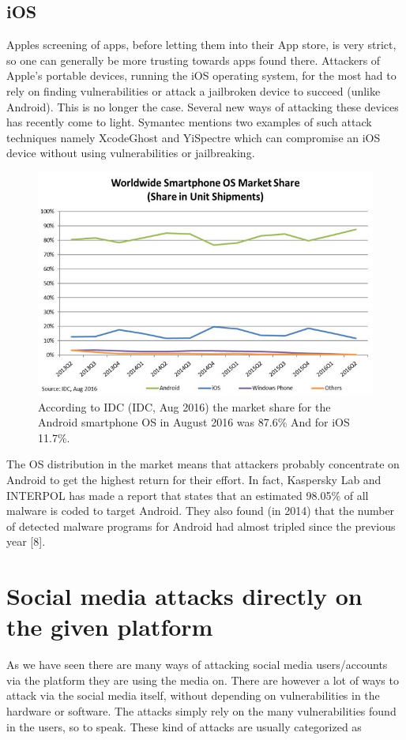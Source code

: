 \subsection{iOS}
Apples screening of apps, before letting them into their App store, is very strict, so one can generally be more trusting towards apps found there. Attackers of Apple’s portable devices, running the iOS operating system, for the most had to rely on finding vulnerabilities or attack a jailbroken device to succeed (unlike Android). This is no longer the case. Several new ways of attacking these devices has recently come to light. Symantec mentions two examples of such attack techniques namely XcodeGhost and YiSpectre which can compromise an iOS device without using vulnerabilities or jailbreaking.
\begin{figure}
\centering
\includegraphics[width=0.8 \textwidth]{fig/smartphone_market_share}
\caption{According to IDC (IDC, Aug 2016) the market share for the Android smartphone OS in August 2016 was 87.6\% And for iOS 11.7\%.\label{fig:smartphone_market_share}}
\end{figure}
The OS distribution in the market means that attackers probably concentrate on Android to get the highest return for their effort. In fact, Kaspersky Lab and INTERPOL has made a report that states that an estimated 98.05\% of all malware is coded to target Android. They also found (in 2014) that the number of detected malware programs for Android had almost tripled since the previous year [8]. 
\section{Social media attacks directly on the given platform}
As we have seen there are many ways of attacking social media users/accounts via the platform they are using the media on. There are however a lot of ways to attack via the social media itself, without depending on vulnerabilities in the hardware or software. The attacks simply rely on the many vulnerabilities found in the users, so to speak. These kind of attacks are usually categorized as 

